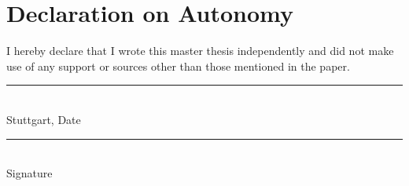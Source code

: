 \cleardoublepage %
\section*{Declaration on Autonomy}
I hereby declare that I wrote this master thesis independently and did not make use of any support or sources other than those mentioned in the paper.

\vspace*{2cm}
\begin{center}
   \begin{minipage}{0.3\textwidth}
      \centering
      \rule{4cm}{0.2mm}\\
      Stuttgart, Date
   \end{minipage}\hfill
   \begin{minipage}{0.6\textwidth}
      \centering
      \rule{8cm}{0.2mm}\\
      Signature
   \end{minipage}
\end{center}
\vfill
